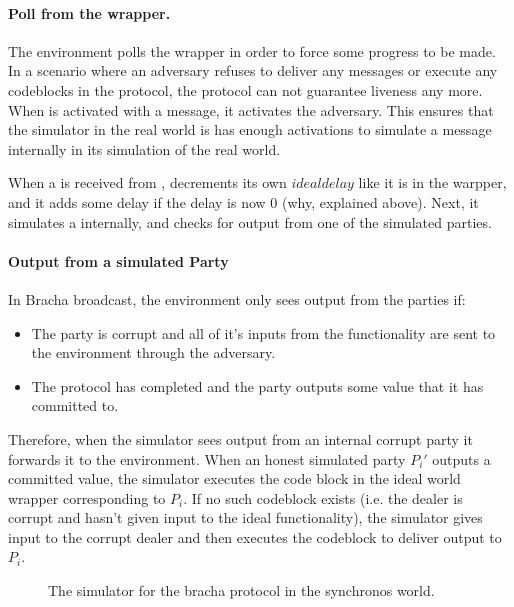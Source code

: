 \paragraph{Poll from the wrapper.}
The environment polls the wrapper in order to force some progress to be made. 
In a scenario where an adversary refuses to deliver any messages or execute any codeblocks in the protocol, the protocol can not guarantee liveness any more.
When \Wsync is activated with a  message, it activates the adversary.
This ensures that the simulator in the real world is has enough activations to simulate a  message internally in its simulation of the real world.

When a  is received from \Wsync, decrements its own $idealdelay$ like it is in the warpper, and it adds some delay if the delay is now 0 (why, explained above).
Next, it simulates a  internally, and checks for output from one of the simulated parties.

\paragraph{Output from a simulated Party}
In Bracha broadcast, the environment only sees output from the parties if:
\begin{itemize}
	\item The party is corrupt and all of it's inputs from the functionality are sent to the environment through the adversary.
	\item The protocol has completed and the party outputs some value that it has committed to.
\end{itemize}
Therefore, when the simulator sees output from an internal corrupt party it forwards it to the environment.
When an honest simulated party $P_i'$ outputs a committed value, the simulator executes the code block in the ideal world wrapper corresponding to $P_i$.
If no such codeblock exists (i.e. the dealer is corrupt and hasn't given input to the ideal functionality), the simulator gives input to the corrupt dealer and then executes the codeblock to deliver output to $P_i$.


\begin{figure}[!htb]
	
	\caption{The simulator for the bracha protocol in the synchronos world.}
	\label{fig:sim:bracha_ours}
\end{figure}

